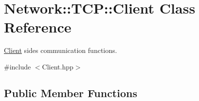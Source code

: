 \hypertarget{class_network_1_1_t_c_p_1_1_client}{}\section{Network\+:\+:T\+CP\+:\+:Client Class Reference}
\label{class_network_1_1_t_c_p_1_1_client}


\hyperlink{class_network_1_1_t_c_p_1_1_client}{Client} side\textquotesingle{}s communication functions.  




{\ttfamily \#include $<$Client.\+hpp$>$}

\subsection*{Public Member Functions}
